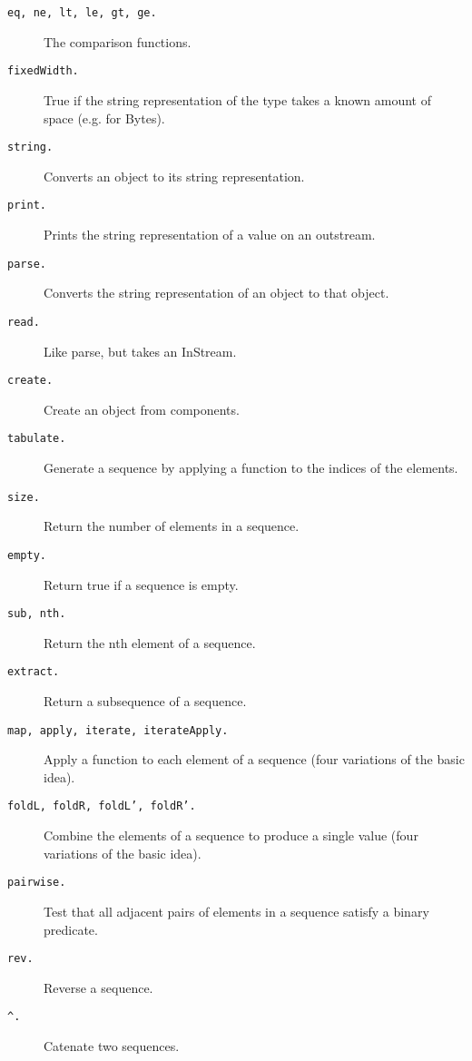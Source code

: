 \begin{description}	
  \item[\tt eq, ne, lt, le, gt, ge.]
		The comparison functions.
  
  \item[\tt fixedWidth.] 
		True if the string representation of the type takes a
		known amount of space (e.g. for Bytes).

  \item[\tt string.] 	Converts an object to its string representation.

  \item[\tt print.]	Prints the string representation of a value on an
		outstream.

  \item[\tt parse.] 	Converts the string representation of an object to that
		object.

  \item[\tt read.]		Like parse, but takes an InStream.

  \item[\tt create.]	Create an object from components.

  \item[\tt tabulate.]	Generate a sequence by applying a function to the
		indices of the elements.

  \item[\tt size.]		Return the number of elements in a sequence.

  \item[\tt empty.]	Return true if a sequence is empty.

  \item[\tt sub, nth.]	Return the nth element of a sequence.

  \item[\tt extract.]	Return a subsequence of a sequence.

  \item[\tt map, apply, iterate, iterateApply.]
		Apply a function to each element of a sequence
		(four variations of the basic idea).

  \item[\tt foldL, foldR, foldL', foldR'.]
		Combine the elements of a sequence to produce a single
		value (four variations of the basic idea).

  \item[\tt pairwise.]	Test that all adjacent pairs of elements in a
		sequence
		satisfy a binary predicate.

  \item[\tt rev.]	Reverse a sequence.

  \item[\tt \^{}.]	Catenate two sequences.
\end{description}

